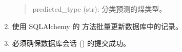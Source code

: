 \documentclass[a4paper,12pt,english]{sphinxmanual}
\begin{document}
\begin{fulllineitems}
\begin{description}
\begin{enumerate}
\begin{quote}
\sphinxAtStartPar
predicted\_type (str): 分类预测的煤类型。
\end{quote}

\item {} 
\sphinxAtStartPar
使用 SQLAlchemy 的  方法批量更新数据库中的记录。

\item {} 
\sphinxAtStartPar
必须确保数据库会话 () 的提交成功。

\end{enumerate}

\end{description}

\end{fulllineitems}

\end{document}
